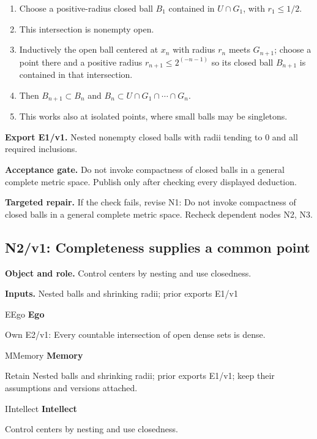 \documentclass[preprint,12pt,aps,pra,showkeys,amsmath,amssymb,superscriptaddress,floatfix]{revtex4-2}
\theoremstyle{definition}
\theoremstyle{remark}
\newcommand{\mmfaculty}[3]{%
 \begin{mmfacultybox}{#1}{#2}
 {\sffamily\bfseries\color{MMBlue}#2}\par\smallskip #3
 \end{mmfacultybox}}
\newcommand{\field}[2]{\par\smallskip\noindent\textbf{#1.} #2\par}
\begin{document}
\begin{enumerate}[label=N1.\arabic*,leftmargin=3.4em]

\item Choose a positive-radius closed ball \(B_{1}\) contained in
\(U\cap G_{1}\), with \(r_{1}\le 1/2\).

\item This intersection is nonempty open.

\item Inductively the open ball centered at \(x_n\) with radius \(r_n\) meets
\(G_{n+1}\); choose a point there and a positive radius
\(r_{n+1}\le 2^{(-n-1)}\) so its closed ball \(B_{n+1}\) is contained in
that intersection.

\item Then \(B_{n+1}\subset B_n\) and
\(B_n\subset U\cap G_{1}\cap \cdots \cap G_n\).

\item This works also at isolated points, where small balls may be singletons.

\end{enumerate}

\field{Export E1/v1}{Nested nonempty closed balls with radii tending to 0 and all required
inclusions.}

\field{Acceptance gate}{Do not invoke compactness of closed balls in a general complete metric
space. Publish only after checking every displayed deduction.}

\field{Targeted repair}{If the check fails, revise N1: Do not invoke compactness of closed balls
in a general complete metric space. Recheck dependent nodes N2, N3.}

\clearpage

\subsection{N2/v1: Completeness supplies a common point}

\field{Object and role}{Control centers by nesting and use closedness.}

\field{Inputs}{Nested balls and shrinking radii; prior exports E1/v1}

\mmfaculty{E}{Ego}{Own E2/v1: Every countable intersection of open dense sets is dense.}

\mmfaculty{M}{Memory}{Retain Nested balls and shrinking radii; prior exports E1/v1; keep their
assumptions and versions attached.}

\mmfaculty{I}{Intellect}{Control centers by nesting and use closedness.}
\end{document}
